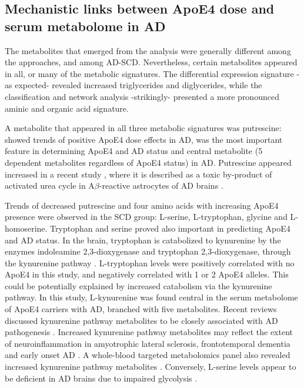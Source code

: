\documentclass{amsart}
\begin{document}
\subsection{Mechanistic links between ApoE4 dose and serum metabolome in AD}
The metabolites that emerged from the analysis were generally different among the approaches, and among AD-SCD. Nevertheless, certain metabolites appeared in all, or many of the metabolic signatures. The differential expression signature -as expected- revealed increased triglycerides and diglycerides, while the classification and network analysis -strikingly- presented a more pronounced aminic and organic acid signature.

A metabolite that appeared in all three metabolic signatures was putrescine: showed trends of positive ApoE4 dose effects in AD, was the most important feature in determining ApoE4 and AD status and central metabolite (5 dependent metabolites regardless of ApoE4 status) in AD. Putrescine appeared increased in a recent study \cite{Ju2021AstrocyticUC}, where it is described as a toxic by-product of activated urea cycle in A$\beta$-reactive astrocytes of AD brains \cite*{Ju2021AstrocyticUC,Wong2022PathogenicP}.

Trends of decreased putrescine and four amino acids with increasing ApoE4 presence were observed in the SCD group: L-serine, L-tryptophan, glycine and L-homoserine. Tryptophan and serine proved also important in predicting ApoE4 and AD status. In the brain, tryptophan is catabolized to kynurenine by the enzymes indoleamine 2,3-dioxygenase and tryptophan 2,3-dioxygenase, through the kynurenine pathway \cite*{Liang2022KynureninePM}. L-tryptophan levels were positively correlated with no ApoE4 in this study, and negatively correlated with 1 or 2 ApoE4 alleles. This could be potentially explained by increased catabolism via the kynurenine pathway. In this study, L-kynurenine was found central in the serum metabolome of ApoE4 carriers with AD, branched with five  metabolites. Recent reviews discussed kynurenine pathway metabolites to be closely associated with AD pathogenesis \cite{Liang2022KynureninePM,Sharma2022KynurenineMA}. Increased kynurenine pathway metabolites may reflect the extent of neuroinflammation in amyotrophic lateral sclerosis, frontotemporal dementia and early onset AD \cite*{Heylen2023BrainKP}. A whole-blood targeted metabolomics panel also revealed increased kynurenine pathway metabolites \cite{Teruya2021WholebloodMO}. Conversely, L-serine levels appear to be deficient in AD brains due to impaired glycolysis \cite{LeDouce2020ImpairmentOG}. 
\end{document}
